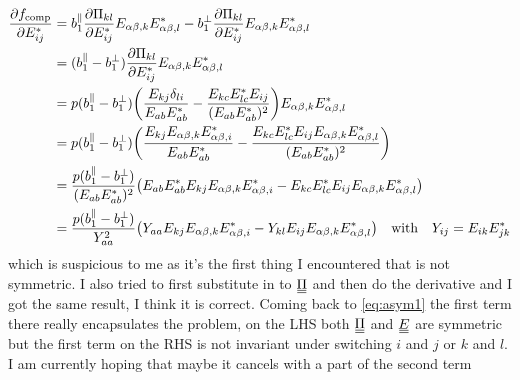 \documentclass{article}
\newcommand\barbelow[1]{\stackunder[1.2pt]{$#1$}{\rule{1.5ex}{.1ex}}}
\newcommand{\du}[1]{\barbelow{\barbelow{#1}}}
\newcommand{\YY}[3][j]{E_{#2#1}E_{#3#1}^*}
\begin{document}
\begin{align}
    \pdv{f_\text{comp}}{E_{ij}^*} &= b_1^\parallel \pdv{\Pi_{kl}}{E_{ij}^*}E_{\alpha\beta,k}E_{\alpha\beta,l}^* - b_1^\perp \pdv{\Pi_{kl}}{E_{ij}^*}E_{\alpha\beta,k}E_{\alpha\beta,l}^* \label{eq:firsttermfirststep} \\
    &= (b_1^\parallel - b_1^\perp) \pdv{\Pi_{kl}}{E_{ij}^*}E_{\alpha\beta,k}E_{\alpha\beta,l}^* \\
    &= p(b_1^\parallel - b_1^\perp) \qty(\frac{E_{kj}\delta_{li}}{\YY[b]{a}{a}} - \frac{\YY[c]{k}{l}E_{ij}}{(\YY[b]{a}{a})^2}) E_{\alpha\beta,k}E_{\alpha\beta,l}^* \\
    &= p(b_1^\parallel - b_1^\perp) \qty(\frac{E_{kj}E_{\alpha\beta,k}E_{\alpha\beta,i}^*}{\YY[b]{a}{a}} - \frac{\YY[c]{k}{l}E_{ij} E_{\alpha\beta,k}E_{\alpha\beta,l}^*}{(\YY[b]{a}{a})^2}) \\
    &= \frac{p(b_1^\parallel - b_1^\perp)}{(\YY[b]{a}{a})^2} \qty(\YY[b]{a}{a}E_{kj}E_{\alpha\beta,k}E_{\alpha\beta,i}^* - \YY[c]{k}{l}E_{ij} E_{\alpha\beta,k}E_{\alpha\beta,l}^*) \\
    &= \frac{p(b_1^\parallel - b_1^\perp)}{Y_{aa}^2} \qty(Y_{aa}E_{kj}E_{\alpha\beta,k}E_{\alpha\beta,i}^* - Y_{kl}E_{ij} E_{\alpha\beta,k}E_{\alpha\beta,l}^*) \qq{with} Y_{ij} = \YY[k]{i}{j}
\end{align}
which is suspicious to me as it's the first thing I encountered that is not symmetric.
I also tried to first substitute in to $\du{\Pi}$ and then do the derivative and I got the same result, I think it is correct.
Coming back to \cref{eq:asym1} the first term there really encapsulates the problem, on the LHS both $\du{\Pi}$ and $\du{E}$ are symmetric but the first term on the RHS is not invariant under switching $i$ and $j$ or $k$ and $l$.
I am currently hoping that maybe it cancels with a part of the second term
\end{document}

